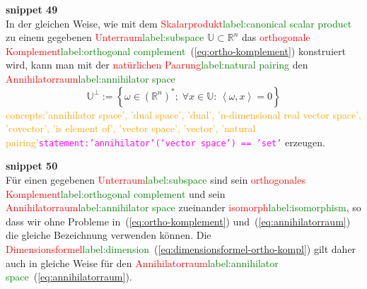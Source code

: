 \documentclass[a4paper,twoside,english,ngerman,deutsch,german,sectrefs,envcountsame,envcountchap]{svmono}
\newcommand{\setref}[2]{\textcolor{red}{#1}\textcolor{green}{#2}}
\newcommand{\snippet}[1]{\textbf{snippet #1}\\}
\newcommand{\eqnote}[2]{\textcolor{orange}{#1}\textcolor{magenta}{\texttt{#2}}}
\begin{document}
\snippet{49}
In der gleichen Weise, wie mit dem \setref{Skalarprodukt}{label:canonical scalar product} zu einem gegebenen \setref{Unterraum}{label:subspace} $\mathbb{U}\subset{\mathbb{R}}^{n}$ das \setref{orthogonale Komplement}{label:orthogonal complement}~(\eqref{eq:ortho-komplement}) konstruiert wird, kann man mit der \setref{natürlichen Paarung}{label:natural pairing} den \setref{Annihilatorraum}{label:annihilator space}
\begin{equation}
\mathbb{U}^{\perp}:=\left\{ \omega\in({\mathbb{R}}^{n})^{*};\;\forall x\in\mathbb{U}:\,\left\langle \omega,x\right\rangle =0\right\} \label{eq:annihilatorraum}
\end{equation}\eqnote{concepts:'annihilator space', 'dual space', 'dual', 'n-dimensional real vector space', 'covector', 'is element of', 'vector space', 'vector', 'natural pairing'}{statement:'annihilator'('vector space') == 'set'}
erzeugen.

\snippet{50}
Für einen gegebenen \setref{Unterraum}{label:subspace} sind sein \setref{orthogonales Komplement}{label:orthogonal complement} und sein \setref{Annihilatorraum}{label:annihilator space} zueinander \setref{isomorph}{label:isomorphism}, so dass wir ohne Probleme in~(\eqref{eq:ortho-komplement}) und~(\eqref{eq:annihilatorraum}) die gleiche Bezeichnung verwenden können. Die \setref{Dimensionsformel}{label:dimension}~(\eqref{eq:dimensionsformel-ortho-kompl}) gilt daher auch in gleiche Weise für den \setref{Annihilatorraum}{label:annihilator space}~(\eqref{eq:annihilatorraum}).
\end{document}
